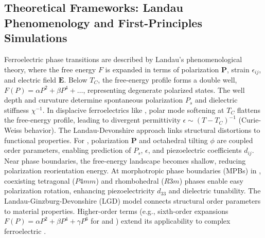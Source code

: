 \documentclass[a4paper,fleqn]{cas-sc}
\begin{document}
\subsection*{Theoretical Frameworks: Landau Phenomenology and First-Principles Simulations}
\par Ferroelectric phase transitions are described by Landau's phenomenological theory, where the free energy \( F \) is expanded in terms of polarization \( \mathbf{P} \), strain \( \epsilon_{ij} \), and electric field \( \mathbf{E} \). Below \( T_C \), the free-energy profile forms a double well, \( F(P) = \alpha P^2 + \beta P^4 + \dots \), representing degenerate polarized states. The well depth and curvature determine spontaneous polarization \( P_s \) and dielectric stiffness \( \chi^{-1} \). In displacive ferroelectrics like , polar mode softening at \( T_C \) flattens the free-energy profile, leading to divergent permittivity \( \epsilon \sim (T - T_C)^{-1} \) (Curie-Weiss behavior). The Landau-Devonshire approach links structural distortions to functional properties. For , polarization \( \mathbf{P} \) and octahedral tilting \( \phi \) are coupled order parameters, enabling prediction of \( P_s \), \( \epsilon \), and piezoelectric coefficients \( d_{ij} \). Near phase boundaries, the free-energy landscape becomes shallow, reducing polarization reorientation energy. At morphotropic phase boundaries (MPBs) in , coexisting tetragonal (\( P4mm \)) and rhombohedral (\( R3m \)) phases enable easy polarization rotation, enhancing piezoelectricity \( d_{33} \) and dielectric tunability. The Landau-Ginzburg-Devonshire (LGD) model connects structural order parameters to material properties. Higher-order terms (e.g., sixth-order expansions \( F(P) = \alpha P^2 + \beta P^4 + \gamma P^6 \) for  and ) extend its applicability to complex ferroelectric \cite{damjanovic2010morphotropic}. 
\end{document}
